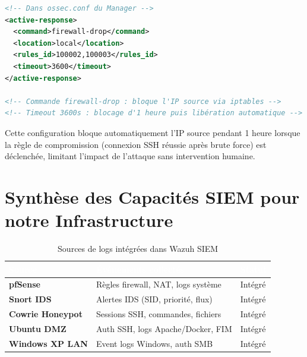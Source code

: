 \documentclass[12pt,a4paper,openany]{report}
\begin{document}
\begin{lstlisting}[language=xml, caption={Configuration de la réponse active : blocage IP automatique}]
<!-- Dans ossec.conf du Manager -->
<active-response>
  <command>firewall-drop</command>
  <location>local</location>
  <rules_id>100002,100003</rules_id>
  <timeout>3600</timeout>
</active-response>

<!-- Commande firewall-drop : bloque l'IP source via iptables -->
<!-- Timeout 3600s : blocage d'1 heure puis libération automatique -->
\end{lstlisting}

Cette configuration bloque automatiquement l'IP source pendant 1 heure lorsque la règle de
compromission (connexion SSH réussie après brute force) est déclenchée, limitant l'impact de
l'attaque sans intervention humaine.

\section{Synthèse des Capacités SIEM pour notre Infrastructure}

\begin{table}[H]
    \centering
    \renewcommand{\arraystretch}{1.8}
    \setlength{\tabcolsep}{10pt}
    \setlength{\arrayrulewidth}{0.8pt}
    \begin{tabularx}{\textwidth}{|>{\bfseries}p{3cm}|X|>{\centering\arraybackslash}p{2.5cm}|}
        \arrayrulecolor{tableborder}
        \hline
        \rowcolor{tableheadbg}
        \textcolor{white}{\textbf{Source}} &
        \textcolor{white}{\textbf{Événements collectés}} &
        \textcolor{white}{\textbf{Statut}} \\
        \hline
        \rowcolor{tablerowalt}
        pfSense & Règles firewall, NAT, logs système & Intégré \\
        \hline
        Snort IDS & Alertes IDS (SID, priorité, flux) & Intégré \\
        \hline
        \rowcolor{tablerowalt}
        Cowrie Honeypot & Sessions SSH, commandes, fichiers & Intégré \\
        \hline
        Ubuntu DMZ & Auth SSH, logs Apache/Docker, FIM & Intégré \\
        \hline
        \rowcolor{tablerowalt}
        Windows XP LAN & Event logs Windows, auth SMB & Intégré \\
        \hline
    \end{tabularx}
    \caption{Sources de logs intégrées dans Wazuh SIEM}
    \label{tab:wazuh-sources}
\end{table}
\end{document}
